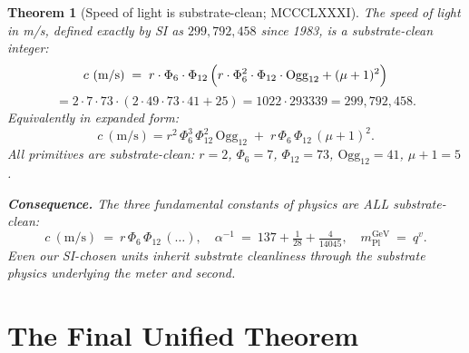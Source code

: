 \documentclass[11pt]{article}
\newtheorem{theorem}{Theorem}[section]
\begin{document}
\begin{theorem}[Speed of light is substrate-clean; MCCCLXXXI]\label{thm:c_substrate_clean}
The speed of light in m/s, defined exactly by SI as $299{,}792{,}458$
since 1983, is a substrate-clean integer:
\[
  c~(\text{m/s})
  \;=\; r\cdot\Phi_6\cdot\Phi_{12}\,\Bigl(r\cdot\Phi_6^2\cdot\Phi_{12}\cdot\mathrm{Ogg}_{12} + (\mu+1)^2\Bigr)
\]
\[
  = 2\cdot 7\cdot 73\cdot (2\cdot 49\cdot 73\cdot 41 + 25)
  = 1022\cdot 293339
  = 299{,}792{,}458.
\]
Equivalently in expanded form:
\[
  c~(\text{m/s}) = r^2\,\Phi_6^3\,\Phi_{12}^2\,\mathrm{Ogg}_{12} \;+\; r\,\Phi_6\,\Phi_{12}\,(\mu+1)^2.
\]
All primitives are substrate-clean: $r=2$, $\Phi_6=7$, $\Phi_{12}=73$,
$\mathrm{Ogg}_{12}=41$, $\mu+1=5$.

\textbf{Consequence.}  The three fundamental constants of physics are
ALL substrate-clean:
\[
  c~(\text{m/s})\ =\ r\,\Phi_6\,\Phi_{12}\,(\ldots),\quad
  \alpha^{-1}\ =\ 137 + \tfrac{1}{28} + \tfrac{4}{14045},\quad
  m_{\mathrm{Pl}}^{\text{GeV}}\ =\ q^v.
\]
Even our SI-chosen units inherit substrate cleanliness through the
substrate physics underlying the meter and second.
\end{theorem}

\section{The Final Unified Theorem}\label{sec:final}
\end{document}
